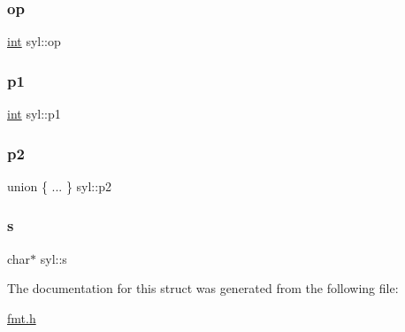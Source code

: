 \subsubsection{\texorpdfstring{op}{op}}
{\footnotesize\ttfamily \hyperlink{lp__lib_8h_adeb9ec6400320e4923ac9d836d509ddb}{int} syl\+::op}

\mbox{\label{structsyl_a302ebd4e0dda93a20c68dada78f2dc8c}} 
\subsubsection{\texorpdfstring{p1}{p1}}
{\footnotesize\ttfamily \hyperlink{lp__lib_8h_adeb9ec6400320e4923ac9d836d509ddb}{int} syl\+::p1}

\mbox{\label{structsyl_a0f3aca6d41f5cce9998bced8303f82d3}} 
\subsubsection{\texorpdfstring{p2}{p2}}
{\footnotesize\ttfamily union \{ ... \}   syl\+::p2}

\mbox{\label{structsyl_afeda6c6954cd797655700a009e581d8c}} 
\subsubsection{\texorpdfstring{s}{s}}
{\footnotesize\ttfamily char$\ast$ syl\+::s}



The documentation for this struct was generated from the following file\+:\begin{DoxyCompactItemize}
\item 
\hyperlink{fmt_8h}{fmt.\+h}\end{DoxyCompactItemize}
